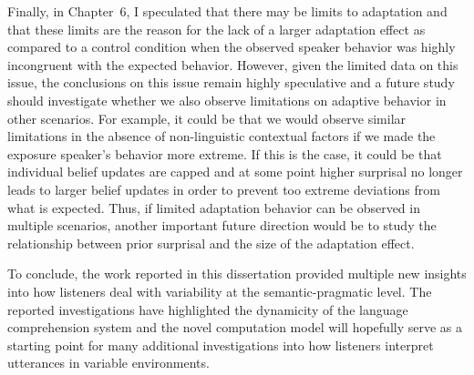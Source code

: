 Finally, in Chapter~6, I speculated that there may be limits to adaptation and that these limits are the reason for the lack of a larger adaptation effect as compared to a control condition when the observed speaker behavior was highly incongruent with the expected behavior. However, given the limited data on this issue, the conclusions on this issue remain highly speculative and a future study should investigate whether we also observe limitations on adaptive behavior in other scenarios. For example, it could be that we would observe similar limitations in the absence of non-linguistic contextual factors if we made the exposure speaker's behavior more extreme. If this is the case, it could be that individual belief updates are capped and at some point higher surprisal no longer leads to larger belief updates in order to prevent too extreme deviations from what is expected. Thus, if limited adaptation behavior can be observed in multiple scenarios, another important future direction would be to study the relationship between prior surprisal and the size of the adaptation effect.

\pagebreak

To conclude, the work reported in this dissertation provided multiple new insights into how listeners deal with variability at the semantic-pragmatic level. The reported investigations have highlighted the dynamicity of the language comprehension system and the novel computation model will hopefully serve as a starting point for many additional investigations into how listeners interpret utterances in variable environments.


